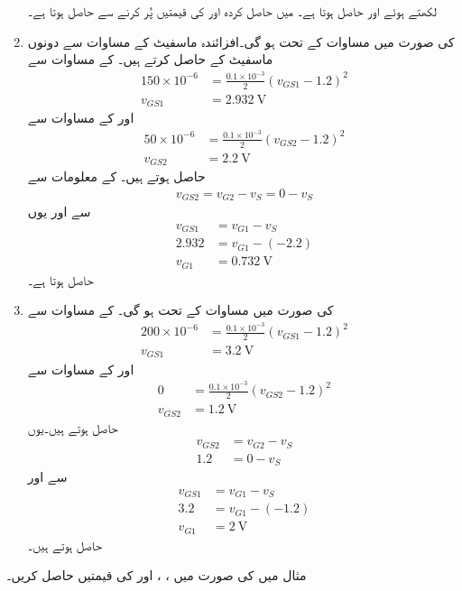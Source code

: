 \begin{enumerate}
 لکھتے ہوئے اور  حاصل
 ہوتا ہے۔ میں حاصل کردہ  اور  کی قیمتیں پُر کرنے سے  حاصل ہوتا ہے۔
\item
{} کی صورت میں مساوات  کے تحت  ہو گی۔افزائندہ ماسفیٹ کے مساوات سے دونوں ماسفیٹ کے  حاصل کرتے ہیں۔ کے مساوات سے
\begin{align*}
150 \times 10^{-6}&=\frac{0.1 \times 10^{-3}}{2}\left(v_{GS1}-1.2 \right)^2\\
v_{GS1}&=\SI{2.932}{\volt}
\end{align*}
اور  کے مساوات سے
\begin{align*}
50 \times 10^{-6}&=\frac{0.1 \times 10^{-3}}{2}\left(v_{GS2}-1.2 \right)^2\\
v_{GS2}&=\SI{2.2}{\volt}
\end{align*}
حاصل ہوتے ہیں۔ کے معلومات سے
\begin{align*}
v_{GS2}=v_{G2}-v_S=0-v_S
\end{align*}
سے  اور یوں 
\begin{align*}
v_{GS1}&=v_{G1}-v_S\\
2.932&=v_{G1}-\left(-2.2 \right)\\
v_{G1}&=\SI{0.732}{\volt}
\end{align*}
حاصل ہوتا ہے۔
\item
{} کی صورت میں مساوات  کے تحت  ہو گی۔ کے مساوات سے
\begin{align*}
200 \times 10^{-6}&=\frac{0.1 \times 10^{-3}}{2} \left(v_{GS1}-1.2 \right)^2\\
v_{GS1}&=\SI{3.2}{\volt}
\end{align*}
اور  کے مساوات سے
\begin{align*}
0&=\frac{0.1 \times 10^{-3}}{2} \left(v_{GS2}-1.2 \right)^2\\
v_{GS2}&=\SI{1.2}{\volt}
\end{align*}
حاصل ہوتے ہیں۔یوں
\begin{align*}
v_{GS2}&=v_{G2}-v_S\\
1.2&=0-v_S
\end{align*}
سے  اور 
\begin{align*}
v_{GS1}&=v_{G1}-v_S\\
3.2&=v_{G1}-\left(-1.2 \right)\\
v_{G1}&=\SI{2}{\volt}
\end{align*}
حاصل ہوتے ہیں۔
\end{enumerate}
مثال  میں  کی صورت میں ، ،  اور  کی قیمتیں  حاصل کریں۔

